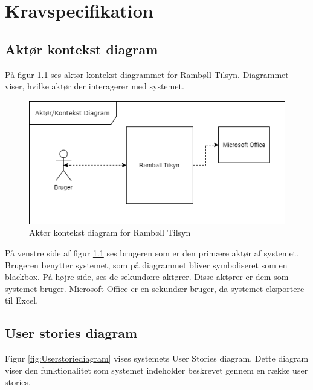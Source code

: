 	\chapter{Kravspecifikation}
	
	\section{Aktør kontekst diagram}
		På figur \ref{fig:AktorKontekst} ses aktør kontekst diagrammet for Rambøll Tilsyn. Diagrammet viser, hvilke aktør der interagerer med systemet.
	\begin{figure}[H]
		\centering
		\includegraphics[width=0.6\linewidth]{Kravspecifikation/AktorDiagram}
		\caption{Aktør kontekst diagram for Rambøll Tilsyn}
		\label{fig:AktorKontekst}
	\end{figure}

	På venstre side af figur \ref{fig:AktorKontekst} ses brugeren som er den primære aktør af systemet. Brugeren benytter systemet, som på diagrammet bliver symboliseret som en blackbox. På højre side, ses de sekundære aktører. Disse aktører er dem som systemet bruger. Microsoft Office er en sekundær bruger, da systemet eksportere til Excel.
	
	\clearpage
	
	\section{User stories diagram}
	Figur \ref{fig:Userstoriediagram} vises systemets User Stories diagram. Dette diagram viser den funktionalitet som systemet indeholder beskrevet gennem en række user stories.
	
